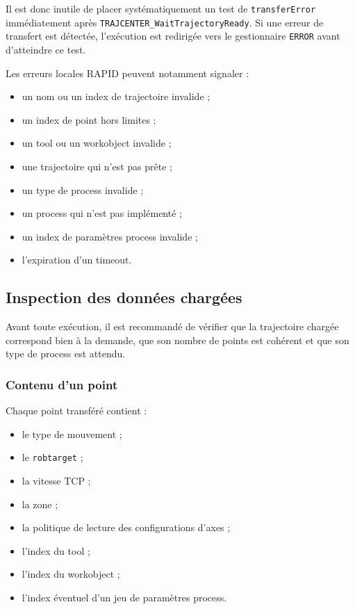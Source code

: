 \documentclass{rapportENSAM}
\begin{document}
Il est donc inutile de placer systématiquement un test de
\texttt{transferError} immédiatement après
\texttt{TRAJCENTER\_WaitTrajectoryReady}. Si une erreur de transfert est
détectée, l'exécution est redirigée vers le gestionnaire \texttt{ERROR} avant
d'atteindre ce test.

Les erreurs locales RAPID peuvent notamment signaler :

\begin{itemize}
    \item un nom ou un index de trajectoire invalide ;
    \item un index de point hors limites ;
    \item un tool ou un workobject invalide ;
    \item une trajectoire qui n'est pas prête ;
    \item un type de process invalide ;
    \item un process qui n'est pas implémenté ;
    \item un index de paramètres process invalide ;
    \item l'expiration d'un timeout.
\end{itemize}


\subsection{Inspection des données chargées}
\label{subsec:rapid-data-inspection}

Avant toute exécution, il est recommandé de vérifier que la trajectoire chargée
correspond bien à la demande, que son nombre de points est cohérent et que son
type de process est attendu.


\subsubsection{Contenu d'un point}
\label{subsubsec:rapid-loaded-point}

Chaque point transféré contient :

\begin{itemize}
    \item le type de mouvement ;
    \item le \texttt{robtarget} ;
    \item la vitesse TCP ;
    \item la zone ;
    \item la politique de lecture des configurations d'axes ;
    \item l'index du tool ;
    \item l'index du workobject ;
    \item l'index éventuel d'un jeu de paramètres process.
\end{itemize}
\end{document}
